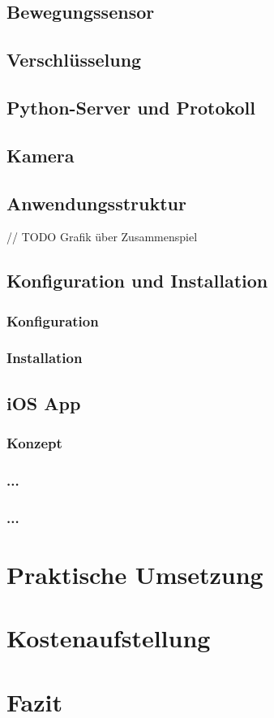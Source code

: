 \section{Bewegungssensor} 
\section{Verschlüsselung}
\section{Python-Server und Protokoll} 

\section{Kamera}
\section{Anwendungsstruktur}
// TODO Grafik über Zusammenspiel
\section{Konfiguration und Installation}
\subsection{Konfiguration}
\subsection{Installation}

\section{iOS App}
\subsection{Konzept}
\subsection{...}
\subsection{...}

\chapter{Praktische Umsetzung}

\chapter{Kostenaufstellung}

\chapter{Fazit}



 

 